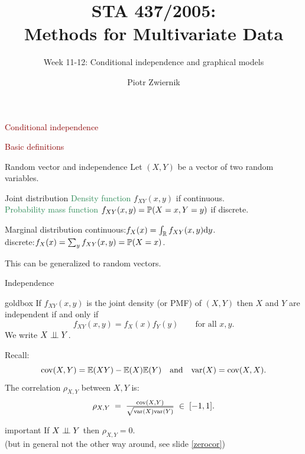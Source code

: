 \documentclass[11pt,handout,aspectratio=169,dvipsnames]{beamer}
\title[STA437-Week1]{STA 437/2005: \\ Methods for Multivariate Data}
\subtitle[]{Week 11-12: Conditional independence and graphical models}
\author[Piotr Zwiernik]{Piotr Zwiernik}
\institute[UofT]{University of Toronto}
\date{}
\begin{document}
\maketitle

\begin{frame}{}
\begin{center}
	{\Huge \textcolor{DarkRed}{Conditional independence}}
\end{center}
\end{frame}

\begin{frame}{}
\begin{center}
	{\huge \textcolor{DarkRed}{Basic definitions}}
\end{center}
\end{frame}

\begin{frame}{Random vector and independence}
	Let $(X,Y)$ be a vector of two random variables.
	\begin{alertblock}{Joint distribution}
		\textcolor{SeaGreen}{Density function} $f_{XY}(x,y)$ if continuous.\\[.1cm]
		\textcolor{SeaGreen}{Probability mass function} $f_{XY}(x,y)=\P(X=x,Y=y)$ if discrete.
	\end{alertblock}
		\begin{alertblock}{Marginal distribution}
continuous:\;\;\;$f_X(x)=\int_\R f_{XY}(x,y){\rm d}y$.\\[.1cm]
discrete:\;\;\;$f_X(x)=\sum_y f_{XY}(x,y)=\P(X=x)$.
	\end{alertblock}
	This can be generalized to random vectors.
\end{frame}

\begin{frame}{Independence}
\begin{beamercolorbox}[wd=\paperwidth,sep=2pt]{goldbox}
	If $f_{XY}(x,y)$ is the joint density (or PMF) of $(X,Y)$ then $X$ and $Y$ are independent if and only if \\[-.5cm] $$ f_{XY}(x,y)=f_X(x)f_Y(y)\qquad\mbox{for all }x,y.$$
		We write \alert{$X\indep Y$}.	
\end{beamercolorbox}
		Recall:
		$$
		\cov(X,Y)=\E(XY)-\E(X)\E(Y)\quad\mbox{and}\quad \var(X)=\cov(X,X).
		$$
		The correlation $\rho_{X,Y}$ between $X,Y$ is:
		$$
		\rho_{X,Y}\;=\;\tfrac{\cov(X,Y)}{\sqrt{\var(X)\var(Y)}}\;\in\;[-1,1].
		$$
		\begin{beamercolorbox}[wd=\paperwidth,sep=2pt]{important}
			If $X\indep Y$ then $\rho_{X,Y}=0$.\\ {\footnotesize(but in general not the other way around, see slide \ref{zerocor})}
		\end{beamercolorbox}
\end{frame}
\end{document}
